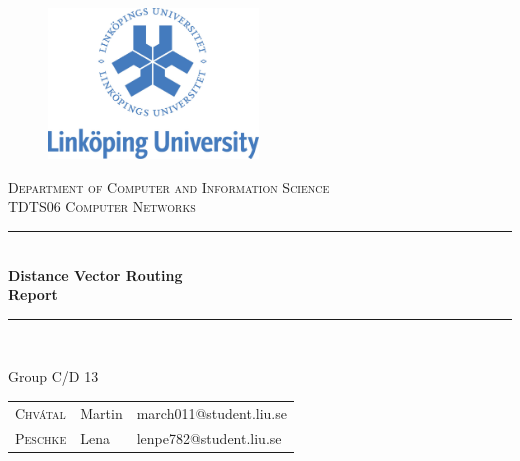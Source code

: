 \documentclass[12pt,a4paper]{article}
\begin{document}
	
\begin{titlepage}
\newcommand{\HRule}{\rule{\linewidth}{0.5mm}} %
\centering %
 
\begin{figure}[!h]
	\begin{center}
	\includegraphics[height=4cm]{liu.jpg}
	\end{center}
\end{figure}

\textsc{\large Department of Computer and Information Science}\\[0.5cm] %
\textsc{\large TDTS06 Computer Networks}\\[2.5cm] %


\HRule \\[0.4cm]
{ \LARGE \bfseries Distance Vector Routing\\[0.4cm] %
\Large \bfseries Report} \\[0.4cm]

\HRule \\[1.5cm]



\large
\begin{centering}
Group C/D 13 \\[0.2cm]
\end{centering}
{\begin{tabular}{lll}
\textsc{Chvátal} & Martin & march011@student.liu.se\\
\textsc{Peschke} & Lena & lenpe782@student.liu.se\\
\end{tabular}}
\\[1.5cm]


\end{titlepage}
\end{document}
